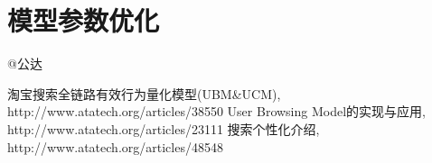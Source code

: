 \section{模型参数优化} 
	@公达

\begin{thebibliography}{99}
 淘宝搜索全链路有效行为量化模型(UBM\&UCM), http://www.atatech.org/articles/38550
 User Browsing Model的实现与应用, http://www.atatech.org/articles/23111
 搜索个性化介绍, http://www.atatech.org/articles/48548
\end{thebibliography}

 
